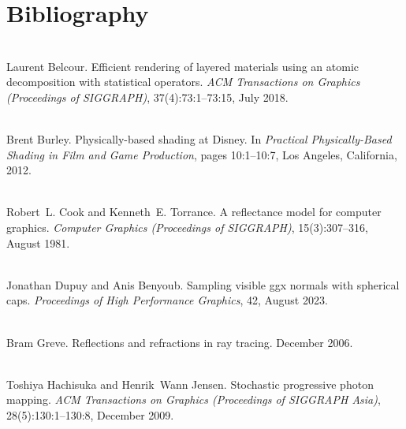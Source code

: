 \chapter{Bibliography}
\hypertarget{citelist}{}\label{citelist}

\begin{DoxyDescription}
\item[\label{citelist_CITEREF_Belcour:2018:Efficient}%
\Hypertarget{citelist_CITEREF_Belcour:2018:Efficient}%
\mbox{[}1\mbox{]}]\hfill \\
Laurent Belcour. Efficient rendering of layered materials using an atomic decomposition with statistical operators. {\itshape ACM Transactions on Graphics (Proceedings of SIGGRAPH)}, 37(4)\+:73\+:1--73\+:15, July 2018. 


\item[\label{citelist_CITEREF_Burley:2012:Physicallybased}%
\Hypertarget{citelist_CITEREF_Burley:2012:Physicallybased}%
\mbox{[}2\mbox{]}]\hfill \\
Brent Burley. Physically-\/based shading at Disney. In {\itshape Practical Physically-\/\+Based Shading in Film and Game Production}, pages 10\+:1--10\+:7, Los Angeles, California, 2012.


\item[\label{citelist_CITEREF_Cook:1981:Reflectance}%
\Hypertarget{citelist_CITEREF_Cook:1981:Reflectance}%
\mbox{[}3\mbox{]}]\hfill \\
Robert~L. Cook and Kenneth~E. Torrance. A reflectance model for computer graphics. {\itshape Computer Graphics (Proceedings of SIGGRAPH)}, 15(3)\+:307--316, August 1981. 


\item[\label{citelist_CITEREF_Dupuy:2023:Sampling}%
\Hypertarget{citelist_CITEREF_Dupuy:2023:Sampling}%
\mbox{[}4\mbox{]}]\hfill \\
Jonathan Dupuy and Anis Benyoub. Sampling visible ggx normals with spherical caps. {\itshape Proceedings of High Performance Graphics}, 42, August 2023. 


\item[\label{citelist_CITEREF_Greve:2006:Reflections}%
\Hypertarget{citelist_CITEREF_Greve:2006:Reflections}%
\mbox{[}5\mbox{]}]\hfill \\
Bram Greve. Reflections and refractions in ray tracing. December 2006.


\item[\label{citelist_CITEREF_Hachisuka:2009:Stochastic}%
\Hypertarget{citelist_CITEREF_Hachisuka:2009:Stochastic}%
\mbox{[}6\mbox{]}]\hfill \\
Toshiya Hachisuka and Henrik~Wann Jensen. Stochastic progressive photon mapping. {\itshape ACM Transactions on Graphics (Proceedings of SIGGRAPH Asia)}, 28(5)\+:130\+:1--130\+:8, December 2009. 



\end{DoxyDescription}
